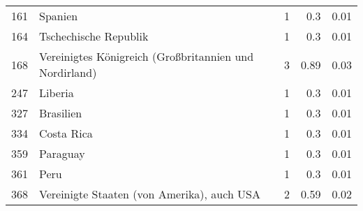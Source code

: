 \begin{longtable}{lXrrr}
        161 & \multicolumn{1}{X}{Spanien} & %
          \num{1} &
          \num[round-mode=places,round-precision=2]{0,3} &
          \num[round-mode=places,round-precision=2]{0,01} \\

        164 & \multicolumn{1}{X}{Tschechische Republik} & %
          \num{1} &
          \num[round-mode=places,round-precision=2]{0,3} &
          \num[round-mode=places,round-precision=2]{0,01} \\

        168 & \multicolumn{1}{X}{Vereinigtes Königreich (Großbritannien und Nordirland)} & %
          \num{3} &
          \num[round-mode=places,round-precision=2]{0,89} &
          \num[round-mode=places,round-precision=2]{0,03} \\

        247 & \multicolumn{1}{X}{Liberia} & %
          \num{1} &
          \num[round-mode=places,round-precision=2]{0,3} &
          \num[round-mode=places,round-precision=2]{0,01} \\

        327 & \multicolumn{1}{X}{Brasilien} & %
          \num{1} &
          \num[round-mode=places,round-precision=2]{0,3} &
          \num[round-mode=places,round-precision=2]{0,01} \\

        334 & \multicolumn{1}{X}{Costa Rica} & %
          \num{1} &
          \num[round-mode=places,round-precision=2]{0,3} &
          \num[round-mode=places,round-precision=2]{0,01} \\

        359 & \multicolumn{1}{X}{Paraguay} & %
          \num{1} &
          \num[round-mode=places,round-precision=2]{0,3} &
          \num[round-mode=places,round-precision=2]{0,01} \\

        361 & \multicolumn{1}{X}{Peru} & %
          \num{1} &
          \num[round-mode=places,round-precision=2]{0,3} &
          \num[round-mode=places,round-precision=2]{0,01} \\

        368 & \multicolumn{1}{X}{Vereinigte Staaten (von Amerika), auch USA} & %
          \num{2} &
          \num[round-mode=places,round-precision=2]{0,59} &
          \num[round-mode=places,round-precision=2]{0,02} \\


\end{longtable}
